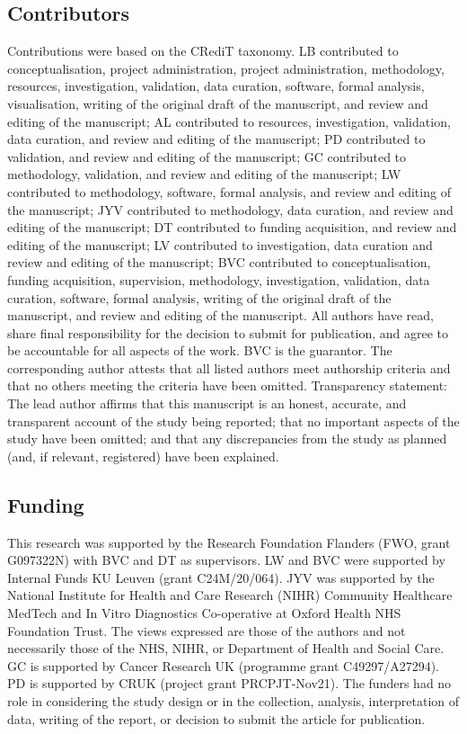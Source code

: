 \subsection*{Contributors}
Contributions were based on the CRediT taxonomy. LB contributed to conceptualisation, project administration, project administration, methodology, resources, investigation, validation, data curation, software, formal analysis, visualisation, writing of the original draft of the manuscript, and review and editing of the manuscript; AL contributed to resources, investigation, validation, data curation, and review and editing of the manuscript; PD contributed to validation, and review and editing of the manuscript; GC contributed to methodology, validation, and review and editing of the manuscript; LW contributed to methodology, software, formal analysis, and review and editing of the manuscript; JYV contributed to methodology, data curation, and review and editing of the manuscript; DT contributed to funding acquisition, and review and editing of the manuscript; LV contributed to investigation, data curation and review and editing of the manuscript; BVC contributed to conceptualisation, funding acquisition, supervision, methodology, investigation, validation, data curation, software, formal analysis, writing of the original draft of the manuscript, and review and editing of the manuscript. All authors have read, share final responsibility for the decision to submit for publication, and agree to be accountable for all aspects of the work. BVC is the guarantor. The corresponding author attests that all listed authors meet authorship criteria and that no others meeting the criteria have been omitted. Transparency statement: The lead author affirms that this manuscript is an honest, accurate, and transparent account of the study being reported; that no important aspects of the study have been omitted; and that any discrepancies from the study as planned (and, if relevant, registered) have been explained.

\subsection*{Funding}
This research was supported by the Research Foundation Flanders (FWO, grant G097322N) with BVC and DT as supervisors. LW and BVC were supported by Internal Funds KU Leuven (grant C24M/20/064). JYV was supported by the National Institute for Health and Care Research (NIHR) Community Healthcare MedTech and In Vitro Diagnostics Co-operative at Oxford Health NHS Foundation Trust. The views expressed are those of the authors and not necessarily those of the NHS, NIHR, or Department of Health and Social Care. GC is supported by Cancer Research UK (programme grant C49297/A27294). PD is supported by CRUK (project grant PRCPJT-Nov21). The funders had no role in considering the study design or in the collection, analysis, interpretation of data, writing of the report, or decision to submit the article for publication.

